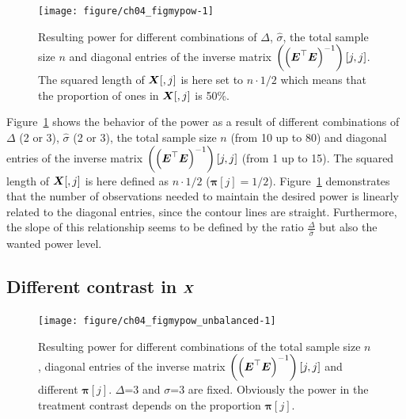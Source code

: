 \documentclass[11pt,a4paper,twoside]{book}\usepackage[]{graphicx}\usepackage[]{xcolor}
\newenvironment{knitrout}{}{} %
\begin{document}
\begin{figure}[H]%
\begin{center}
\begin{knitrout}
\color{fgcolor}
\texttt{[image: figure/ch04\_figmypow-1]} 
\end{knitrout}
\end{center}
\vspace{-1.2cm}
\caption{Resulting power for different combinations of $\Delta$, $\hat\sigma$, the total sample size $n$ and diagonal entries of the inverse matrix $\left(\left({\boldsymbol{E}}^\top{\boldsymbol{E}}\right)^{-1}\right)[j,j]$. The squared length of ${\boldsymbol{X}}[,j]$ is here set to $n\cdot 1/2$ which means that the proportion of ones in ${\boldsymbol{X}}[,j]$ is 50\%.}
\label{fig:mypow}
\end{figure}

Figure~\ref{fig:mypow} shows the behavior of the power as a result of different combinations of $\Delta$ (2 or 3), $\hat\sigma$ (2 or 3), the total sample size $n$ (from 10 up to 80) and diagonal entries of the inverse matrix $\left(\left({\boldsymbol{E}}^\top{\boldsymbol{E}}\right)^{-1}\right)[j,j]$ (from 1 up to 15). The squared length of ${\boldsymbol{X}}[,j]$ is here defined as $n\cdot 1/2$ ($\boldsymbol{\pi}[j]=1/2$). Figure~\ref{fig:mypow} demonstrates that the number of observations needed to maintain the desired power is linearly related to the diagonal entries, since the contour lines are straight. Furthermore, the slope of this relationship seems to be defined by the ratio $\frac{\Delta}{\hat\sigma}$ but also the wanted power level.

\subsection*{Different contrast in ${\boldsymbol{X}}$}
\begin{figure}[h!]%
\begin{center}
\begin{knitrout}
\color{fgcolor}
\texttt{[image: figure/ch04\_figmypow\_unbalanced-1]} 
\end{knitrout}
\end{center}
\vspace{-1.2cm}
\caption{Resulting power for different combinations of the total sample size $n$, diagonal entries of the inverse matrix $\left(\left({\boldsymbol{E}}^\top{\boldsymbol{E}}\right)^{-1}\right)[j,j]$ and different $\boldsymbol{\pi}[j]$. $\Delta$=3 and $\sigma$=3 are fixed. Obviously the power in the treatment contrast depends on the proportion $\boldsymbol{\pi}[j]$.}
\label{fig:mypow_unbalanced}
\end{figure}
\end{document}
